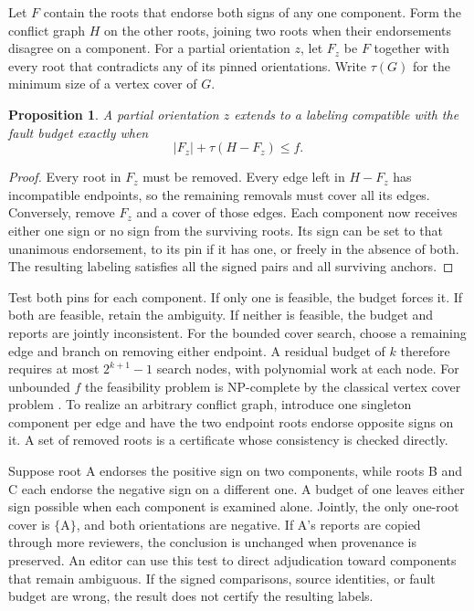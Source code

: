 \documentclass[11pt]{article}
\newtheorem{proposition}{Proposition}
\begin{document}
Let $F$ contain the roots that endorse both signs of any one
component. Form the conflict graph $H$ on the other roots,
joining two roots when their endorsements disagree on a
component. For a partial orientation $z$, let $F_z$ be $F$
together with every root that contradicts any of its pinned
orientations. Write $\tau(G)$ for the minimum size of a vertex
cover of $G$.

\begin{proposition}
A partial orientation $z$ extends to a labeling compatible with
the fault budget exactly when
\[
 |F_z|+\tau(H-F_z)\le f .
\]
\end{proposition}
\begin{proof}
Every root in $F_z$ must be removed. Every edge left in $H-F_z$
has incompatible endpoints, so the remaining removals must cover
all its edges. Conversely, remove $F_z$ and a cover of those
edges. Each component now receives either one sign or no sign
from the surviving roots. Its sign can be set to that unanimous
endorsement, to its pin if it has one, or freely in the absence
of both. The resulting labeling satisfies all the signed pairs
and all surviving anchors.
\end{proof}

Test both pins for each component. If only one is feasible, the
budget forces it. If both are feasible, retain the ambiguity.
If neither is feasible, the budget and reports are jointly
inconsistent. For the bounded cover search, choose a remaining
edge and branch on removing either endpoint. A residual budget
of $k$ therefore requires at most $2^{k+1}-1$ search nodes,
with polynomial work at each node. For unbounded $f$ the
feasibility problem is NP-complete by the classical vertex cover
problem \cite{karp}. To realize an arbitrary conflict graph,
introduce one singleton component per edge and have the two
endpoint roots endorse opposite signs on it. A set of removed
roots is a certificate whose consistency is checked directly.

Suppose root A endorses the positive sign on two components,
while roots B and C each endorse the negative sign on a
different one. A budget of one leaves either sign possible
when each component is examined alone. Jointly, the only
one-root cover is $\{\mathrm{A}\}$, and both orientations are
negative. If A's reports are copied through more reviewers,
the conclusion is unchanged when provenance is preserved.
An editor can use this test to direct adjudication toward
components that remain ambiguous. If the signed comparisons,
source identities, or fault budget are wrong, the result
does not certify the resulting labels.
\end{document}
